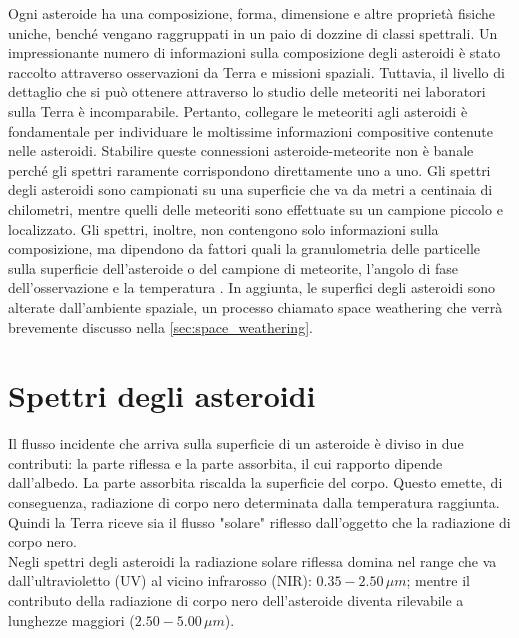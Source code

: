 Ogni asteroide ha una composizione, forma, dimensione e altre proprietà fisiche uniche, benché vengano raggruppati in un paio di dozzine di classi spettrali. Un impressionante numero di informazioni sulla composizione degli asteroidi è stato raccolto attraverso osservazioni da Terra e missioni spaziali. Tuttavia, il livello di dettaglio che si può ottenere attraverso lo studio delle meteoriti nei laboratori sulla Terra è incomparabile. Pertanto, collegare le meteoriti agli asteroidi è fondamentale per individuare le moltissime informazioni compositive contenute nelle asteroidi. Stabilire queste connessioni asteroide-meteorite non è banale perché gli spettri raramente corrispondono direttamente uno a uno. Gli spettri degli asteroidi sono campionati su una superficie che va da metri a centinaia di chilometri, mentre quelli delle meteoriti sono effettuate su un campione piccolo e localizzato. Gli spettri, inoltre, non contengono solo informazioni sulla composizione, ma dipendono da fattori quali la granulometria delle particelle sulla superficie dell'asteroide o del campione di meteorite, l'angolo di fase dell'osservazione e la temperatura \citep{demeo_connecting_2022}. In aggiunta, le superfici degli asteroidi sono alterate dall'ambiente spaziale, un processo chiamato space weathering che verrà brevemente discusso nella \cref{sec:space_weathering}.



\section{Spettri degli asteroidi}
Il flusso incidente che arriva sulla superficie di un asteroide è diviso in due contributi: la parte riflessa e la parte assorbita, il cui rapporto dipende dall'albedo. La parte assorbita riscalda la superficie del corpo. Questo emette, di conseguenza, radiazione di corpo nero determinata dalla temperatura raggiunta. Quindi la Terra riceve sia il flusso "solare" riflesso dall'oggetto che la radiazione di corpo nero.\\
Negli spettri degli asteroidi la radiazione solare riflessa domina nel range che va dall'ultravioletto (UV) al vicino infrarosso (NIR): $0.35-2.50\,\mu m$; mentre il contributo della radiazione di corpo nero dell'asteroide diventa rilevabile a lunghezze maggiori ($2.50-5.00\,\mu m$).

